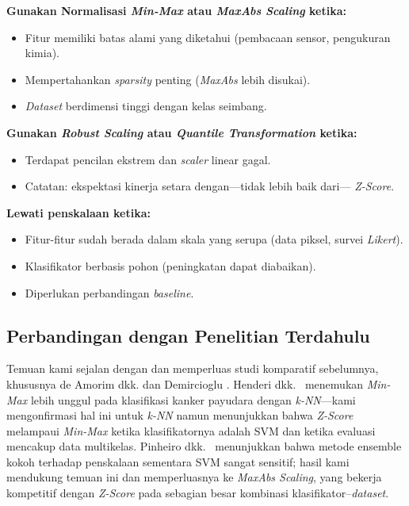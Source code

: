 \documentclass[12pt,a4paper]{article}
\begin{document}
\textbf{Gunakan Normalisasi \textit{Min-Max} atau \textit{MaxAbs Scaling} ketika:}
\begin{itemize}
  \item Fitur memiliki batas alami yang diketahui (pembacaan sensor, pengukuran
  kimia).
  \item Mempertahankan \textit{sparsity} penting (\textit{MaxAbs} lebih disukai).
  \item \textit{Dataset} berdimensi tinggi dengan kelas seimbang.
\end{itemize}

\textbf{Gunakan \textit{Robust Scaling} atau \textit{Quantile Transformation} ketika:}
\begin{itemize}
  \item Terdapat pencilan ekstrem dan \textit{scaler} linear gagal.
  \item Catatan: ekspektasi kinerja setara dengan---tidak lebih baik dari---
  \textit{Z-Score}.
\end{itemize}

\textbf{Lewati penskalaan ketika:}
\begin{itemize}
  \item Fitur-fitur sudah berada dalam skala yang serupa (data piksel, survei
  \textit{Likert}).
  \item Klasifikator berbasis pohon (peningkatan dapat diabaikan).
  \item Diperlukan perbandingan \textit{baseline}.
\end{itemize}

\subsection{Perbandingan dengan Penelitian Terdahulu}
\label{sec:comparison}

Temuan kami sejalan dengan dan memperluas studi komparatif sebelumnya, khususnya
de Amorim dkk. \cite{amorim2023scaling} dan Demircioglu
\cite{demircioglu2024normalization}. Henderi dkk.~\cite{henderi2021minmax}
menemukan \textit{Min-Max} lebih unggul pada klasifikasi kanker payudara dengan
\textit{k-NN}---kami mengonfirmasi hal ini untuk \textit{k-NN} namun menunjukkan
bahwa \textit{Z-Score} melampaui \textit{Min-Max} ketika klasifikatornya adalah
SVM dan ketika evaluasi mencakup data multikelas. Pinheiro
dkk.~\cite{pinheiro2025scaling} menunjukkan bahwa metode ensemble kokoh terhadap
penskalaan sementara SVM sangat sensitif; hasil kami mendukung temuan ini dan
memperluasnya ke \textit{MaxAbs Scaling}, yang bekerja kompetitif dengan
\textit{Z-Score} pada sebagian besar kombinasi klasifikator--\textit{dataset}.
\end{document}
